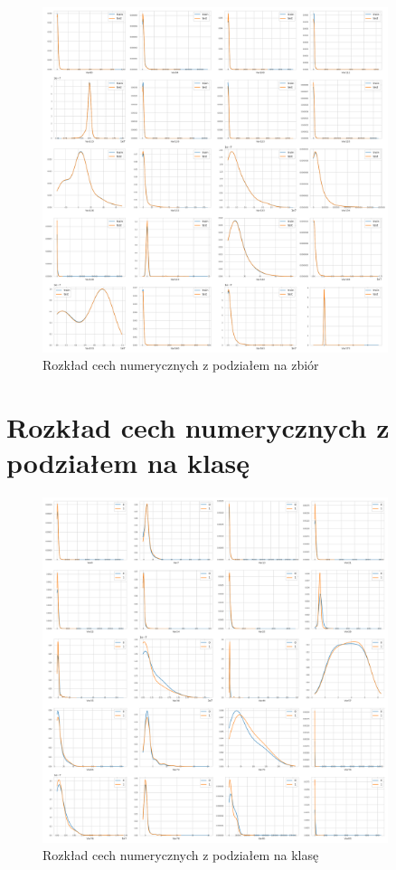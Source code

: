 \documentclass[a4paper,12pt]{article}
\begin{document}
\begin{appendices}
        \begin{figure}[!h]
            \centering
            \includegraphics[width=0.9\textwidth]{../images/feature-distribution-20-40-train-test.png}
            \caption{Rozkład cech numerycznych z podziałem na zbiór}
        \end{figure}

        \newpage

        \section{Rozkład cech numerycznych z podziałem na klasę}\label{appendix:rozklad-cech-numerycznych-klasy}

        \begin{figure}[!h]
            \centering
            \includegraphics[width=0.9\textwidth]{../images/feature-distribution-0-20.png}
            \caption{Rozkład cech numerycznych z podziałem na klasę}
        \end{figure}


\end{appendices}
\end{document}
